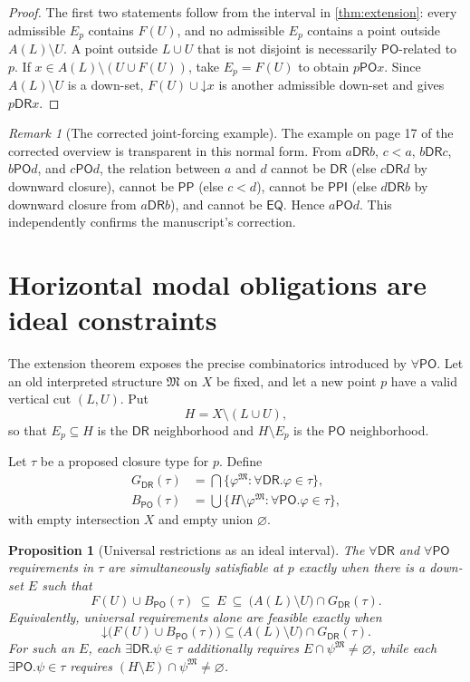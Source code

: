 \documentclass[11pt]{article}
\newtheorem{proposition}[theorem]{Proposition}
\theoremstyle{definition}
\theoremstyle{remark}
\newtheorem{remark}[theorem]{Remark}
\newcommand{\EQ}{\mathsf{EQ}}
\newcommand{\PP}{\mathsf{PP}}
\newcommand{\PPI}{\mathsf{PPI}}
\newcommand{\PO}{\mathsf{PO}}
\newcommand{\DR}{\mathsf{DR}}
\newcommand{\down}{\mathord{\downarrow}}
\begin{document}
\begin{proof}
The first two statements follow from the interval in \cref{thm:extension}: every admissible $E_p$ contains $F(U)$, and no admissible $E_p$ contains a point outside $A(L)\setminus U$.  A point outside $L\cup U$ that is not disjoint is necessarily $\PO$-related to $p$.  If $x\in A(L)\setminus(U\cup F(U))$, take $E_p=F(U)$ to obtain $p\PO x$.  Since $A(L)\setminus U$ is a down-set, $F(U)\cup\down x$ is another admissible down-set and gives $p\DR x$.
\end{proof}

\begin{remark}[The corrected joint-forcing example]
The example on page 17 of the corrected overview is transparent in this normal form.  From $a\DR b$, $c<a$, $b\DR c$, $b\PO d$, and $c\PO d$, the relation between $a$ and $d$ cannot be $\DR$ (else $c\DR d$ by downward closure), cannot be $\PP$ (else $c<d$), cannot be $\PPI$ (else $d\DR b$ by downward closure from $a\DR b$), and cannot be $\EQ$.  Hence $a\PO d$.  This independently confirms the manuscript's correction.
\end{remark}

\section{Horizontal modal obligations are ideal constraints}

The extension theorem exposes the precise combinatorics introduced by $\forall\PO$.  Let an old interpreted structure $\mathfrak M$ on $X$ be fixed, and let a new point $p$ have a valid vertical cut $(L,U)$.  Put
\[
  H=X\setminus(L\cup U),
\]
so that $E_p\subseteq H$ is the $\DR$ neighborhood and $H\setminus E_p$ is the $\PO$ neighborhood.

Let $\tau$ be a proposed closure type for $p$.  Define
\begin{align*}
 G_{\DR}(\tau)&=\bigcap\{\varphi^{\mathfrak M}: \forall\DR.\varphi\in\tau\},\\
 B_{\PO}(\tau)&=\bigcup\{H\setminus\varphi^{\mathfrak M}: \forall\PO.\varphi\in\tau\},
\end{align*}
with empty intersection $X$ and empty union $\varnothing$.

\begin{proposition}[Universal restrictions as an ideal interval]\label{prop:modal-ideals}
The $\forall\DR$ and $\forall\PO$ requirements in $\tau$ are simultaneously satisfiable at $p$ exactly when there is a down-set $E$ such that
\[
 F(U)\cup B_{\PO}(\tau)
 \ \subseteq\ E\ \subseteq\
 \bigl(A(L)\setminus U\bigr)\cap G_{\DR}(\tau).\tag{\(**\)}
\]
Equivalently, universal requirements alone are feasible exactly when
\[
 \down\bigl(F(U)\cup B_{\PO}(\tau)\bigr)
 \subseteq
 \bigl(A(L)\setminus U\bigr)\cap G_{\DR}(\tau).
\]
For such an $E$, each $\exists\DR.\psi\in\tau$ additionally requires
$E\cap\psi^{\mathfrak M}\neq\varnothing$, while each $\exists\PO.\psi\in\tau$ requires
$(H\setminus E)\cap\psi^{\mathfrak M}\neq\varnothing$.
\end{proposition}
\end{document}
